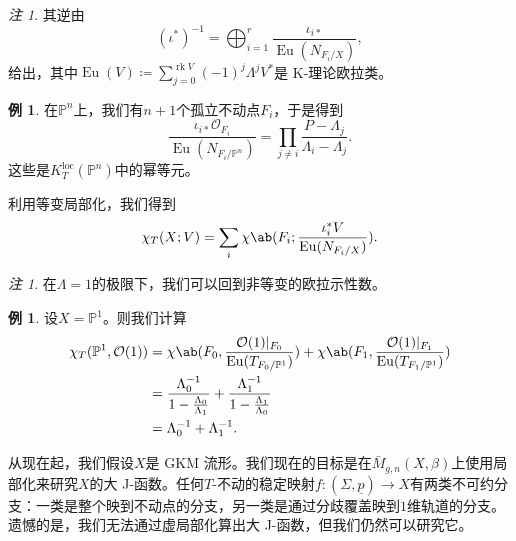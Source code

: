 \documentclass{amsart}
\theoremstyle{definition}
\newtheorem{exm}[thm]{例}
\theoremstyle{remark}
\newtheorem{rmk}[thm]{注}
\theoremstyle{plain}
\theoremstyle{definition}
\theoremstyle{remark}
\renewcommand{\P}{\mathbb{P}}
\newcommand{\mc}[1]{\mathcal{#1}}
\newcommand{\mr}[1]{\mathrm{#1}}
\newcommand{\on}[1]{\operatorname{#1}}
\newcommand{\ul}[1]{\underline{#1}}
\newcommand{\1}{\mathbf{1}}
\newcommand{\2}{\mathbf{2}}
\newcommand{\3}{\mathbf{3}}
\newcommand{\loc}{\mr{loc}}
\begin{document}
\begin{rmk}
    其逆由
    \[ (\iota^*)^{-1} = \bigoplus_{i=1}^r \frac{\iota_{i*}}{\on{Eu}(N_{F_i/X})}, \]
    给出，其中\(\on{Eu}(V) \coloneqq \sum_{j = 0}^{\on{rk} V} (-1)^j \Lambda^j V^*\)是 K-理论欧拉类。
\end{rmk}

\begin{exm}
    在\(\P^n\)上，我们有\(n+1\)个孤立不动点\(F_i\)，于是得到
    \[ \frac{\iota_{i*} \mc{O}_{F_i}}{\on{Eu}(N_{F_i/\P^n})} = \prod_{j \neq i} \frac{P - \Lambda_j}{\Lambda_i - \Lambda_j}. \]
    这些是\(K_T^{\loc}(\P^n)\)中的幂等元。
\end{exm}

利用等变局部化，我们得到
\[ \chi_T(X; V) = \sum_i \chi\ab(F_i; \frac{\iota_i^* V}{\on{Eu}(N_{F_i/X})}). \]

\begin{rmk}
    在\(\Lambda = 1\)的极限下，我们可以回到非等变的欧拉示性数。
\end{rmk}

\begin{exm}
    设\(X = \P^1\)。则我们计算
    \begin{align*}
        \chi_T(\P^1, \mc{O}(1)) &= \chi\ab(F_0, \frac{\mc{O}(1)|_{F_0}}{\on{Eu}(T_{F_0/\P^1})}) + \chi\ab(F_1, \frac{\mc{O}(1)|_{F_1}}{\on{Eu}(T_{F_1/\P^1})}) \\
        &= \frac{\Lambda_0^{-1}}{1 - \frac{\Lambda_0}{\Lambda_1}} + \frac{\Lambda_1^{-1}}{1 - \frac{\Lambda_1}{\Lambda_0}} \\
        &= \Lambda_0^{-1} + \Lambda_1^{-1}. 
    \end{align*}
\end{exm}

从现在起，我们假设\(X\)是 GKM 流形。我们现在的目标是在\(\bar{M}_{g,n}(X, \beta)\)上使用局部化来研究\(X\)的大 J-函数。任何\(T\)-不动的稳定映射\(f \colon (\Sigma, \ul{p}) \to X\)有两类不可约分支：一类是整个映到不动点的分支，另一类是通过分歧覆盖映到\(1\)维轨道的分支。遗憾的是，我们无法通过虚局部化算出大 J-函数，但我们仍然可以研究它。
\end{document}
